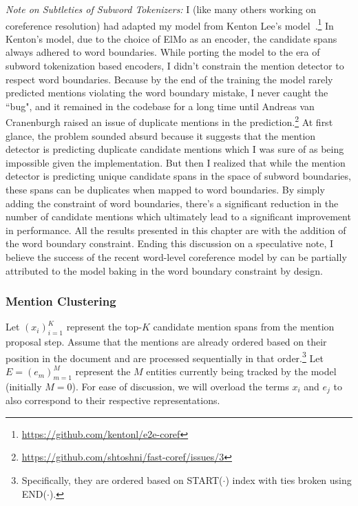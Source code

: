 \documentclass[12pt]{thesis-umich}[thesis]
\begin{document}
\emph{Note on Subtleties of Subword Tokenizers:} 
 I (like many others working on coreference resolution) had adapted my model from Kenton Lee's model~\cite{lee-etal-2017-end, lee-etal-2018-higher}.\footnote{\url{https://github.com/kentonl/e2e-coref}}   In Kenton's model, due to the choice of ElMo \cite{peters-etal-2018-deep} as an encoder, the candidate spans  always adhered to word boundaries. While porting the model to the era of subword tokenization based encoders, I didn't constrain the mention detector to respect word boundaries. Because by the end of the training the model rarely predicted mentions violating the word boundary mistake, I never caught the ``bug", and it remained in the codebase for a long time until Andreas van Cranenburgh raised an issue of duplicate mentions in the prediction.\footnote{\url{https://github.com/shtoshni/fast-coref/issues/3}}
 At first glance, the problem sounded absurd because it suggests that the mention detector is predicting duplicate candidate mentions which I was sure of as being impossible given the implementation. But then I realized that while the mention detector is predicting unique candidate spans in the space of subword boundaries, these spans can be duplicates when mapped to word boundaries. 
  By simply adding the constraint of word boundaries, there's a significant reduction in the number of candidate mentions which ultimately lead to a significant improvement in performance. 
  All the results presented in this chapter are with the addition of the word boundary constraint. 
  Ending this discussion on a speculative note, I believe the success of the  recent word-level coreference model by \citet{dobrovolskii-2021-word} can be partially attributed to the model baking in the word boundary constraint by design.

 











\subsubsection{Mention Clustering}
Let $(x_i)_{i=1}^K$ represent the top-$K$ candidate mention spans from the mention proposal step. Assume that the mentions are already ordered based on their position in the document and are processed sequentially in that order.\footnote{Specifically, they are ordered based on START($\cdot$) index with ties broken using END($\cdot$).}
Let $E = (e_m)_{m=1}^M$ represent the $M$ entities currently being tracked by the model (initially $M = 0$).
For ease of discussion, we will overload the terms $x_i$ and $e_j$ to also correspond to their respective representations.
\end{document}

